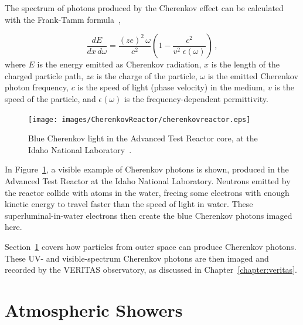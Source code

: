   The spectrum of photons produced by the Cherenkov effect can be calculated with the Frank-Tamm formula~\cite{franktamm1,franktamm2},
  
  \begin{equation}\label{eqn:franktamm}
    \frac{dE}{dx\,d\omega}=\frac{(ze)^2 \, \omega}{c^2} \left ( 1 - \frac{c^2}{v^2 \;\epsilon(\omega)} \right ) \,,
  \end{equation}
  where $E$ is the energy emitted as Cherenkov radiation, $x$ is the length of the charged particle path, $ze$ is the charge of the particle, $\omega$ is the emitted Cherenkov photon frequency, $c$ is the speed of light (phase velocity) in the medium, $v$ is the speed of the particle, and $\epsilon(\omega)$ is the frequency-dependent permittivity.
  
  \begin{figure}[!t]
    \centering
    \texttt{[image: images/CherenkovReactor/cherenkovreactor.eps]}
    \caption[Cherenkov Light from a Reactor]{
      Blue Cherenkov light in the Advanced Test Reactor core, at the Idaho National Laboratory~\cite{cherenkovreactor,atrlab}.
    }
    \label{fig:cherenkovreactor}
  \end{figure}
  
  In Figure~\ref{fig:cherenkovreactor}, a visible example of Cherenkov photons is shown, produced in the Advanced Test Reactor at the Idaho National Laboratory.
  Neutrons emitted by the reactor collide with atoms in the water, freeing some electrons with enough kinetic energy to travel faster than the speed of light in water.
  These superluminal-in-water electrons then create the blue Cherenkov photons imaged here.
  
  Section~\ref{sec:atmoshowers} covers how particles from outer space can produce Cherenkov photons.
  These UV- and visible-spectrum Cherenkov photons are then imaged and recorded by the VERITAS observatory, as discussed in Chapter~\ref{chapter:veritas}.
  
    
\section{Atmospheric Showers}\label{sec:atmoshowers}


